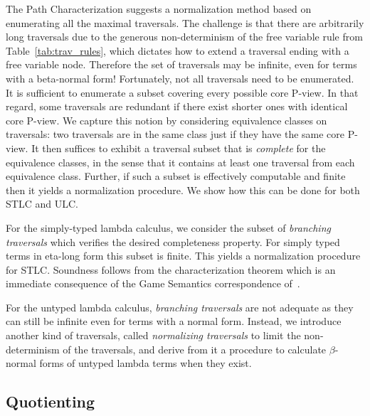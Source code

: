 \documentclass{elsarticle}
\theoremstyle{plain}
\theoremstyle{definition}
\theoremstyle{remark}
\begin{document}
The Path Characterization suggests a normalization method based on enumerating all the maximal traversals. The challenge is that there are
 arbitrarily long traversals due to the generous non-determinism of the free variable rule  from Table~\ref{tab:trav_rules}, which dictates how to extend a traversal ending with a free variable node. Therefore the set of traversals may be infinite, even for terms with a beta-normal form! Fortunately, not all traversals need to be enumerated. It is sufficient to enumerate a subset covering every possible core P-view. In that regard, some traversals are redundant if there exist shorter ones with identical core P-view.
We capture this notion by considering equivalence classes on traversals: two traversals are in the same class just if they have the same core P-view. It then suffices to exhibit a traversal subset that is \emph{complete} for the equivalence classes, in the sense that it contains at least one traversal from each equivalence class. Further, if such a subset is effectively computable and finite then it yields a normalization procedure. We show how this can be done for both STLC and ULC.

For the simply-typed lambda calculus, we consider the subset of \emph{branching traversals} which verifies the desired completeness property. For simply typed terms in eta-long form this subset is finite. This yields a normalization procedure for STLC. Soundness follows from the characterization theorem which is an immediate consequence of the Game Semantics correspondence of~\cite{BlumPhd}.

For the untyped lambda calculus, \emph{branching traversals} are not adequate as they can still be infinite even for terms with a normal form. Instead, we introduce another kind of traversals, called \emph{normalizing traversals} to limit the non-determinism of the traversals, and derive from it a procedure to calculate $\beta$-normal forms of untyped lambda terms when they exist.

\subsection{Quotienting}
\end{document}
